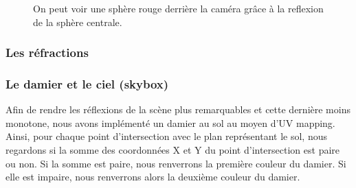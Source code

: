 \documentclass[11pt]{article}
\begin{document}
\begin{figure}[h!]

	\caption{On peut voir une sphère rouge derrière la caméra grâce à la reflexion de la sphère centrale.}
	\label{reflectionsDemo}
\end{figure}
\FloatBarrier

\subsubsection{Les réfractions}
\label{refractions}

\subsubsection{Le damier et le ciel (skybox)}
\label{checkerboardSkybox}
Afin de rendre les réflexions de la scène plus remarquables et cette dernière moins monotone, nous avons implémenté un damier au sol au moyen d'UV mapping. Ainsi, pour chaque point d'intersection avec le plan représentant le sol, nous regardons si la somme des coordonnées X et Y du point d'intersection est paire ou non. Si la somme est paire, nous renverrons la première couleur du damier. Si elle est impaire, nous renverrons alors la deuxième couleur du damier.\\
\end{document}
